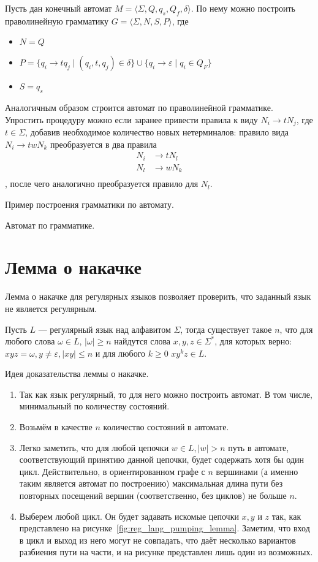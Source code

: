 Пусть дан конечный автомат $M = \langle \Sigma, Q, q_s, Q_f, \delta \rangle$. По нему можно построить праволинейную грамматику $G=\langle \Sigma, N, S, P \rangle$, где
\begin{itemize}
    \item $N = Q$
    \item $P = \{ q_i \to t q_j \mid (q_i, t, q_j)\in \delta\} \cup \{ q_i \to \varepsilon \mid q_i \in Q_F\}$
    \item $S = q_s$
\end{itemize}

Аналогичным образом строится автомат по праволинейной грамматике.
Упростить процедуру можно если заранее привести правила к виду $N_i \to tN_j$, где $t\in \Sigma$, добавив необходимое количество новых нетерминалов:
правило вида $N_i \to twN_k$ преобразуется в два правила 
\begin{align*}
    N_i& \to tN_l\\
    N_l& \to wN_k \\
\end{align*}
, после чего аналогично преобразуется правило для $N_l$.

Пример построения грамматики по автомату.

Автомат по грамматике. 

\section{Лемма о накачке}

Лемма о накачке для регулярных языков позволяет проверить, что заданный язык не является регулярным.

\begin{lemma}
    Пусть $L$ --- регулярный язык над алфавитом $\Sigma$, тогда существует такое $n$, что для любого слова $\omega \in L$, $|\omega| \geq n$ найдутся слова $x,y,z\in \Sigma^*$, для которых верно: $xyz = \omega, y\neq \varepsilon,|xy|\leq n$ и для любого $k \geq 0$  $xy^kz \in L$.
\end{lemma}

Идея доказательства леммы о накачке.

\begin{enumerate}
    \item Так как язык регулярный, то для него можно построить автомат. В том числе, минимальный по количеству состояний.
    \item Возьмём в качестве $n$ количество состояний в автомате.
    \item Легко заметить, что для любой цепочки $w \in L, |w| > n$ путь в автомате, соответствующий принятию данной цепочки, будет содержать хотя бы один цикл.
          Действительно, в ориентированном графе с $n$ вершинами (а именно таким является автомат по построению) максимальная длина пути без повторных посещений вершин (соответственно, без циклов) не больше $n$.
    \item Выберем любой цикл. Он будет задавать искомые цепочки $x, y$ и $z$ так, как представлено на рисунке~\ref{fig:reg_lang_pumping_lemma}.
    Заметим, что вход в цикл и выход из него могут не совпадать, что даёт несколько вариантов разбиения пути на части, и на рисунке представлен лишь один из возможных.
\end{enumerate}


